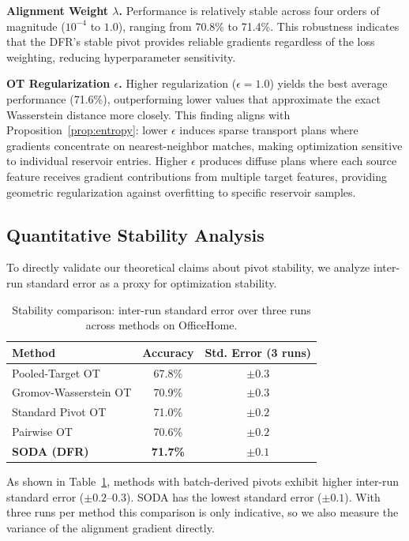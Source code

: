 \textbf{Alignment Weight $\lambda$.} Performance is relatively stable across four orders of magnitude ($10^{-4}$ to $1.0$), ranging from 70.8\% to 71.4\%. This robustness indicates that the DFR's stable pivot provides reliable gradients regardless of the loss weighting, reducing hyperparameter sensitivity.

\textbf{OT Regularization $\epsilon$.} Higher regularization ($\epsilon = 1.0$) yields the best average performance (71.6\%), outperforming lower values that approximate the exact Wasserstein distance more closely. This finding aligns with Proposition~\ref{prop:entropy}: lower $\epsilon$ induces sparse transport plans where gradients concentrate on nearest-neighbor matches, making optimization sensitive to individual reservoir entries. Higher $\epsilon$ produces diffuse plans where each source feature receives gradient contributions from multiple target features, providing geometric regularization against overfitting to specific reservoir samples.

\subsection{Quantitative Stability Analysis}
\label{ssec:stability_analysis}

To directly validate our theoretical claims about pivot stability, we analyze inter-run standard error as a proxy for optimization stability.

\begin{table}[t]
\caption{Stability comparison: inter-run standard error over three runs across methods on OfficeHome.}
\label{tab:stability_comparison}
\centering
\small
\begin{tabular}{lcc}
\toprule
\textbf{Method} & \textbf{Accuracy} & \textbf{Std. Error (3 runs)} \\
\midrule
Pooled-Target OT & 67.8\% & $\pm 0.3$ \\
Gromov-Wasserstein OT & 70.9\% & $\pm 0.3$ \\
Standard Pivot OT & 71.0\% & $\pm 0.2$ \\
Pairwise OT & 70.6\% & $\pm 0.2$ \\
\textbf{SODA (DFR)} & \textbf{71.7\%} & $\pm 0.1$ \\
\bottomrule
\end{tabular}
\end{table}

As shown in Table~\ref{tab:stability_comparison}, methods with batch-derived pivots exhibit higher inter-run standard error ($\pm 0.2$--$0.3$). SODA has the lowest standard error ($\pm 0.1$). With three runs per method this comparison is only indicative, so we also measure the variance of the alignment gradient directly.

